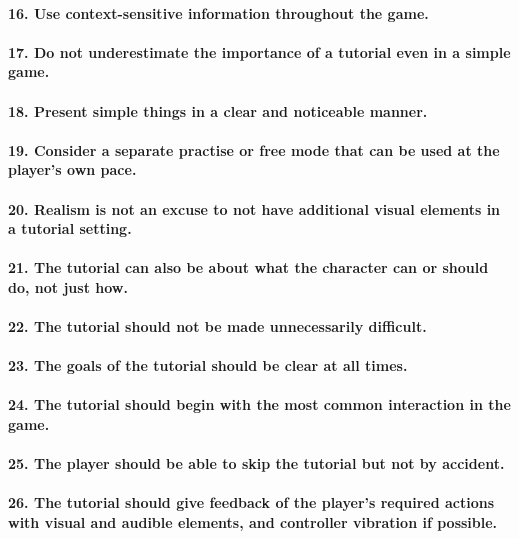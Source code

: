 \paragraph{16. Use context-sensitive information throughout the game. }
\paragraph{17. Do not underestimate the importance of a tutorial even in a simple game.}
\paragraph{18. Present simple things in a clear and noticeable manner.}
\paragraph{19. Consider a separate practise or free mode that can be used at the player's own pace.}
\paragraph{20. Realism is not an excuse to not have additional visual elements in a tutorial setting.}
\paragraph{21. The tutorial can also be about what the character can or should do, not just how.}
\paragraph{22. The tutorial should not be made unnecessarily difficult.}
\paragraph{23. The goals of the tutorial should be clear at all times.}
\paragraph{24. The tutorial should begin with the most common interaction in the game.}
\paragraph{25. The player should be able to skip the tutorial but not by accident.}
\paragraph{26. The tutorial should give feedback of the player's required actions with visual and audible elements, and controller vibration if possible.}
